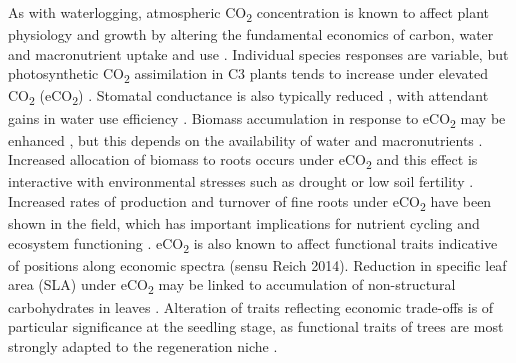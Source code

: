 \documentclass[openright,12pt,a4paper]{memoir}
\begin{document}
As with waterlogging, atmospheric CO\textsubscript{2} concentration is known to affect plant physiology and growth by altering the fundamental economics of carbon, water and macronutrient uptake and use \citep{Poorter2003a, Wang2012, Reich2014}.  Individual species responses are variable, but photosynthetic CO\textsubscript{2} assimilation in C3 plants tends to increase under elevated CO\textsubscript{2} (eCO\textsubscript{2}) \citep{Curtis1996}. Stomatal conductance is also typically reduced \citep{Ainsworth2007}, with attendant gains in water use efficiency \citep{Holtum2010, Keenan2013, VanderSleen2014}. Biomass accumulation in response to eCO\textsubscript{2} may be enhanced \citep{Wang2012}, but this depends on the availability of water and macronutrients \citep{Korner2006, Manea2014, Reich2014}. Increased allocation of biomass to roots occurs under eCO\textsubscript{2} \citep{Nie2013} and this effect is interactive with environmental stresses such as drought or low soil fertility \citep{Wang2010}. Increased rates of production and turnover of fine roots under eCO\textsubscript{2} have been shown in the field, which has important implications for nutrient cycling and ecosystem functioning \citep{Pregitzer1995, Pregitzer2000, Matamala2000, Lipson2014}. eCO\textsubscript{2} is also known to affect functional traits indicative of positions along economic spectra (sensu Reich 2014). Reduction in specific leaf area (SLA) under eCO\textsubscript{2} may be linked to accumulation of non-structural carbohydrates in leaves \citep{Poorter2003a, Bader2010}. Alteration of traits reflecting economic trade-offs is of particular significance at the seedling stage, as functional traits of trees are most strongly adapted to the regeneration niche \citep{Poorter2007}.
\end{document}
